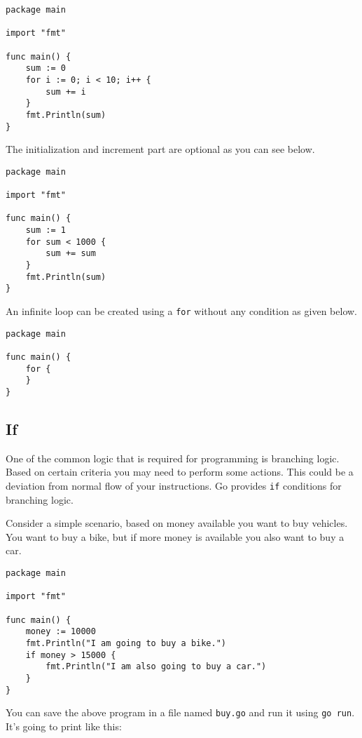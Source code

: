 \begin{lstlisting}[caption=For loop (sum2.go)]
package main

import "fmt"

func main() {
    sum := 0
    for i := 0; i < 10; i++ {
        sum += i
    }
    fmt.Println(sum)
}
\end{lstlisting}

The initialization and increment part are optional as you can see
below.

\begin{lstlisting}[caption=For loop (sum3.go)]
package main

import "fmt"

func main() {
    sum := 1
    for sum < 1000 {
        sum += sum
    }
    fmt.Println(sum)
}
\end{lstlisting}

An infinite loop can be created using a \texttt{for} without any
condition as given below.

\begin{lstlisting}[caption=Infinite For loop]
package main

func main() {
    for {
    }
}
\end{lstlisting}

\subsection{If}

One of the common logic that is required for programming is branching
logic.  Based on certain criteria you may need to perform some
actions.  This could be a deviation from normal flow of your
instructions.  Go provides \texttt{if} conditions for
branching logic.

Consider a simple scenario, based on money available you want to buy
vehicles.  You want to buy a bike, but if more money is available you
also want to buy a car.

\begin{lstlisting}[caption=If control structure (buy.go)]
package main

import "fmt"

func main() {
    money := 10000
    fmt.Println("I am going to buy a bike.")
    if money > 15000 {
        fmt.Println("I am also going to buy a car.")
    }
}
\end{lstlisting}

You can save the above program in a file named \texttt{buy.go} and run
it using \texttt{go run}.  It's going to print like this:

